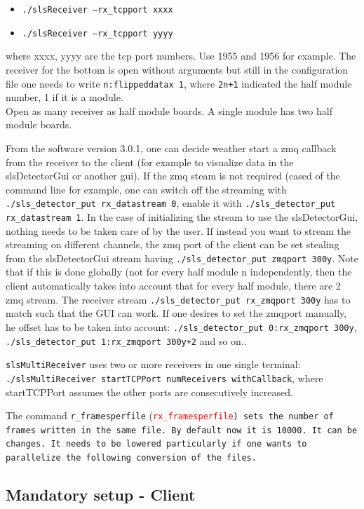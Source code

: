 \documentclass{article}
\begin{document}
\begin{itemize}
\item {\tt{./slsReceiver --rx\_tcpport xxxx}} 
\item {\tt{./slsReceiver --rx\_tcpport yyyy}}
\end{itemize}
where xxxx, yyyy are the tcp port numbers. Use 1955 and 1956 for example. The receiver for the bottom is open without arguments but still in the configuration file one needs to write {\tt{n:flippeddatax 1}}, where {\tt{2n+1}} indicated the half module number, 1 if it is a module.
\\ Open as many receiver as half module boards. A single module has two half module boards.

From the software version 3.0.1, one can decide weather start a zmq callback from the receiver to the client (for example to visualize data in the slsDetectorGui or another gui). If the zmq steam is not required (cased of the command line for example, one can switch off the streaming with {\tt{./sls\_detector\_put rx\_datastream 0}}, enable it with {\tt{./sls\_detector\_put rx\_datastream 1}}. In the case of initializing the stream to use the slsDetectorGui, nothing needs to be taken care of by the user. If instead you want to stream the streaming on different channels, the zmq port of the client can be set stealing from the slsDetectorGui stream having {\tt{./sls\_detector\_put zmqport 300y}}. Note that if this is done globally (not for every half module n independently, then the client automatically takes into account that for every half module, there are 2 zmq stream. The receiver stream {\tt{./sls\_detector\_put rx\_zmqport 300y}} has to match such that the GUI can work. 
If one desires to set the zmqport manually, he offset has to be taken into account: {\tt{./sls\_detector\_put 0:rx\_zmqport 300y}}, {\tt{./sls\_detector\_put 1:rx\_zmqport 300y+2}} and so on..


{\tt{slsMultiReceiver}} uses two or more receivers in one single terminal: {\tt{./slsMultiReceiver startTCPPort numReceivers withCallback}}, where startTCPPort assumes the other ports are consecutively increased.

The command {\tt{r\_framesperfile}} (\tt{\textcolor{red}{rx\_framesperfile}}) sets the number of frames written in the same file. By default now it is 10000. It can be changes. It needs to be lowered particularly if one wants to parallelize the following conversion of the files. 


\subsection{Mandatory setup - Client}
\end{document}
